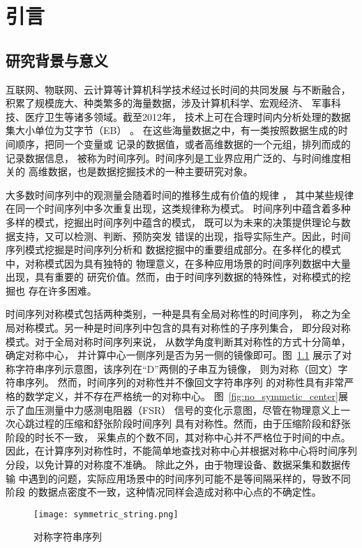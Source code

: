 
\chapter{引言}

\section{研究背景与意义}
互联网、物联网、云计算等计算机科学技术经过长时间的共同发展
与不断融合，积累了规模庞大、种类繁多的海量数据，涉及计算机科学、宏观经济、
军事科技、医疗卫生等诸多领域\cite{2022968}。截至2012年，
技术上可在合理时间内分析处理的数据集大小单位为艾字节（EB）
\cite{DBLP:journals/jbd/TsaiLCV15}。
在这些海量数据之中，有一类按照数据生成的时间顺序，把同一个变量或
记录的数据值，或者高维数据的一个元组，排列而成的记录数据信息，
被称为时间序列。时间序列是工业界应用广泛的、与时间维度相关的
高维数据，也是数据挖掘技术的一种主要研究对象。

大多数时间序列中的观测量会随着时间的推移生成有价值的规律
\cite{DBLP:conf/sdm/MueenKZCW09}，
其中某些规律在同一个时间序列中多次重复出现，这类规律称为模式。
时间序列中蕴含着多种多样的模式，挖掘出时间序列中蕴含的模式，
既可以为未来的决策提供理论与数据支持，又可以检测、判断、预防突发
错误的出现，指导实际生产。因此，时间序列模式挖掘是时间序列分析和
数据挖掘中的重要组成部分。在多样化的模式中，对称模式因为具有独特的
物理意义，在多种应用场景的时间序列数据中大量出现，具有重要的
研究价值\cite{2022968}。然而，由于时间序列数据的特殊性，对称模式的挖掘也
存在许多困难。

时间序列对称模式包括两种类别，一种是具有全局对称性的时间序列，
称之为全局对称模式。另一种是时间序列中包含的具有对称性的子序列集合，
即分段对称模式。对于全局对称时间序列来说，
从数学角度判断其对称性的方式十分简单，确定对称中心，
并计算中心一侧序列是否为另一侧的镜像即可。图~\ref{fig:symmetric_string}
展示了对称字符串序列示意图，该序列在“D”两侧的子串互为镜像，
则为对称（回文）字符串序列\cite{DBLP:journals/corr/abs-2003-08211}。
然而，时间序列的对称性并不像回文字符串序列
的对称性具有非常严格的数学定义，并不存在严格统一的对称中心。
图~\ref{fig:no_symmetic_center}展示了血压测量中力感测电阻器（FSR）
信号的变化示意图，尽管在物理意义上一次心跳过程的压缩和舒张阶段时间序列
具有对称性。然而，由于压缩阶段和舒张阶段的时长不一致，
采集点的个数不同，其对称中心并不严格位于时间的中点。
因此，在计算序列对称性时，不能简单地查找对称中心并根据对称中心将时间序列
分段，以免计算的对称度不准确\cite{DBLP:journals/csda/DaiNG18}。
除此之外，由于物理设备、数据采集和数据传输
中遇到的问题，实际应用场景中的时间序列可能不是等间隔采样的，导致不同阶段
的数据点密度不一致，这种情况同样会造成对称中心点的不确定性。
\begin{figure}
  \centering
  \texttt{[image: symmetric\_string.png]}
  \caption{对称字符串序列}
  \label{fig:symmetric_string}
\end{figure}

